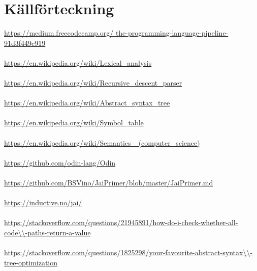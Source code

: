 \documentclass{theme}
\begin{document}
\section{Källförteckning}

\url{https://medium.freecodecamp.org/
the-programming-language-pipeline-91d3f449c919}\\\\
\url{https://en.wikipedia.org/wiki/Lexical_analysis}\\\\
\url{https://en.wikipedia.org/wiki/Recursive_descent_parser}\\\\
\url{https://en.wikipedia.org/wiki/Abstract_syntax_tree}\\\\
\url{https://en.wikipedia.org/wiki/Symbol_table}\\\\
\url{https://en.wikipedia.org/wiki/Semantics_ (computer_science)}\\\\
\url{https://github.com/odin-lang/Odin}\\\\
\url{https://github.com/BSVino/JaiPrimer/blob/master/JaiPrimer.md}\\\\
\url{https://inductive.no/jai/}\\\\
\url{https://stackoverflow.com/questions/21945891/how-do-i-check-whether-all-code\\-paths-return-a-value}\\\\
\url{https://stackoverflow.com/questions/1825298/your-favourite-abstract-syntax\\-tree-optimization}\\\\
\end{document}

